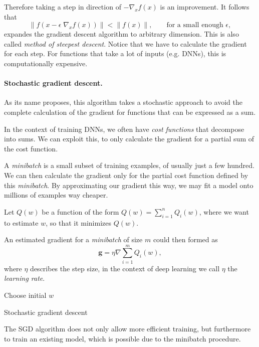 Therefore taking a step in direction of \(-\nabla_x f(x)\) is an improvement.
It follows that
\begin{equation}
    \lVert f(x - \epsilon \; \nabla_x f(x)) \rVert < \lVert f(x) \rVert, \qquad \text{for a small enough } \epsilon,
\end{equation}
expandes the gradient descent algorithm to arbitrary dimension. This is also called \emph{method of steepest descent}.
Notice that we have to calculate the gradient for each step.
For functions that take a lot of inputs (e.g. DNNs), this is computationally expensive.

\paragraph{Stochastic gradient descent.} 
As its name proposes, this algorithm takes a stochastic approach to avoid the complete calculation of the gradient for functions that can be expressed as a sum.

In the context of training DNNs, we often have \emph{cost functions} that decompose into sums.
We can exploit this, to only calculate the gradient for a partial sum of the cost function.

A \emph{minibatch} is a small subset of training examples, of usually just a few hundred.
We can then calculate the gradient only for the partial cost function defined by this \emph{minibatch}.
By approximating our gradient this way, we may fit a model onto millions of examples way cheaper. 

Let \(Q(w)\) be a function of the form \(Q(w) = \sum^{n}_{i = 1} Q_i(w)\), where we want to estimate \(w\), so that it minimizes \(Q(w)\).

An estimated gradient for a \emph{minibatch} of size \(m\) could then formed as
\begin{equation}
    \boldsymbol{g} = \eta \nabla \sum^{m}_{i = 1} Q_i(w),
\end{equation}
where \(\eta\) describes the step size, in the context of deep learning we call \(\eta\) the \emph{learning rate}.

\begin{algorithm}[H]
    Choose initial $w$\;
    \caption{Stochastic gradient descent}
\end{algorithm}
The SGD algorithm does not only allow more efficient training, but furthermore to train an existing model, which is possible due to the minibatch procedure.

